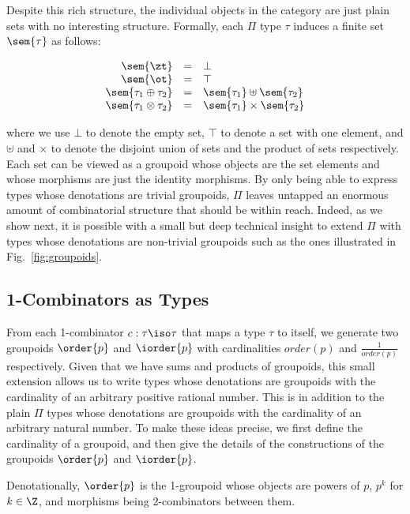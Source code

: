 Despite this rich structure, the individual objects in the category
are just plain sets with no interesting structure. Formally, each
$\Pi$ type $\tau$ induces a finite set $\sem{\tau}$ as follows:

\[\begin{array}{rcl}
\sem{\zt} &=& \bot \\
\sem{\ot} &=& \top \\
\sem{\tau_1 \oplus \tau_2} &=& \sem{\tau_1} \uplus \sem{\tau_2} \\
\sem{\tau_1 \otimes \tau_2} &=& \sem{\tau_1} \times \sem{\tau_2}
\end{array}\]

\noindent where we use $\bot$ to denote the empty set, $\top$ to
denote a set with one element, and $\uplus$ and $\times$ to denote the
disjoint union of sets and the product of sets respectively. Each set
can be viewed as a groupoid whose objects are the set elements and
whose morphisms are just the identity morphisms. By only being able to
express types whose denotations are trivial groupoids, $\Pi$ leaves
untapped an enormous amount of combinatorial structure that should be
within reach. Indeed, as we show next, it is possible with a small but
deep technical insight to extend $\Pi$ with types whose denotations
are non-trivial groupoids such as the ones illustrated in
Fig.~\ref{fig:groupoids}.

\subsection{1-Combinators as Types}

From each 1-combinator $c : \tau \iso \tau$ that maps a type $\tau$ to
itself, we generate two groupoids $\order{p}$ and $\iorder{p}$ with
cardinalities $\mathit{order}(p)$ and $\frac{1}{\mathit{order}(p)}$
respectively. Given that we have sums and products of groupoids, this
small extension allows us to write types whose denotations are
groupoids with the cardinality of an arbitrary positive rational
number. This is in addition to the plain $\Pi$ types whose denotations
are groupoids with the cardinality of an arbitrary natural number. To
make these ideas precise, we first define the cardinality of a
groupoid, and then give the details of the constructions of the
groupoids $\order{p}$ and $\iorder{p}$.

\begin{definition}[$\order{p}$]
  Denotationally, $\order{p}$ is the 1-groupoid whose objects are powers
  of $p$, $p^k$ for $k \in \Z$, and morphisms being 2-combinators
  between them.
\end{definition}


